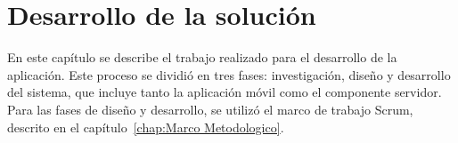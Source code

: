 \chapter{Desarrollo de la solución} \label{chapter:Desarrollo de la aplicacion}

En este capítulo se describe el trabajo realizado para el desarrollo de la aplicación. Este proceso se dividió en tres fases: investigación, diseño y desarrollo del sistema, que incluye tanto la aplicación móvil como el componente servidor. Para las fases de diseño y desarrollo, se utilizó el marco de trabajo Scrum, descrito en el capítulo~\ref{chap:Marco Metodologico}.
